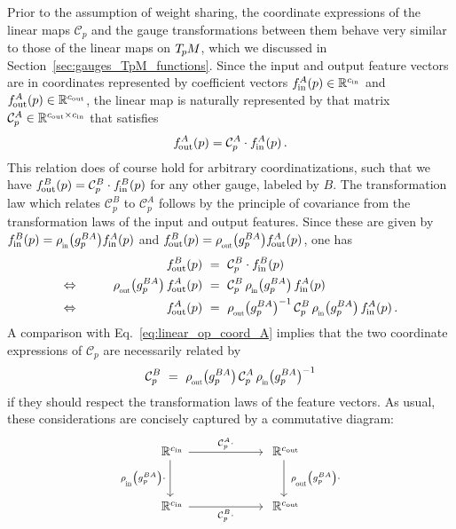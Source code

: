 Prior to the assumption of weight sharing, the coordinate expressions of the linear maps $\mathcal{C}_p$ and the gauge transformations between them behave very similar to those of the linear maps on $T_{\mkern-1.5mu p}\mkern-.5muM$, which we discussed in Section~\ref{sec:gauges_TpM_functions}.
Since the input and output feature vectors are in coordinates represented by coefficient vectors $f_\textup{\;\!\!in}^A(p) \in \mathbb{R}^{{c_\textup{in}}}$ and $f_\textup{\:\!\!out}^A(p) \in \mathbb{R}^{{c_\textup{out}}}$, the linear map is naturally represented by that matrix $\mathcal{C}_p^A \in \mathbb{R}^{{c_\textup{out}}\times{c_\textup{in}}}$ that satisfies
\begin{align}\label{eq:linear_op_coord_A}
    f_\textup{\:\!\!out}^A(p) = \mathcal{C}_p^A \cdot f_\textup{\;\!\!in}^A(p) \,.
\end{align}
This relation does of course hold for arbitrary coordinatizations, such that we have $f_\textup{\:\!\!out}^B(p) = \mathcal{C}_p^B \cdot f_\textup{\;\!\!in}^B(p)$ for any other gauge, labeled by $B$.
The transformation law which relates $\mathcal{C}_p^B$ to $\mathcal{C}_p^A$ follows by the principle of covariance from the transformation laws of the input and output features.
Since these are given by $\fin^B(p) = \rhoin\big( g_p^{BA}\big) \fin^A(p)$ and $\fout^B(p) = \rhoout\big( g_p^{BA}\big) \fout^A(p)$, one has
\begin{alignat}{3}
    && \fout^B(p)\ &=\ \mathcal{C}_p^B \cdot \fin^B(p)
    \notag \\ \Leftrightarrow \qquad
    && \rhoout\big( g_p^{BA}\big)\, \fout^A(p)\ &=\ \mathcal{C}_p^B\, \rhoin\big( g_p^{BA}\big)\, \fin^A(p)
    \notag \\ \Leftrightarrow \qquad
    && \fout^A(p)\ &=\ \rhoout\big( g_p^{BA}\big)^{-1}\, \mathcal{C}_p^B\, \rhoin\big( g_p^{BA}\big)\, \fin^A(p) \,.
\end{alignat}
A comparison with Eq.~\eqref{eq:linear_op_coord_A} implies that the two coordinate expressions of $\mathcal{C}_p$ are necessarily related by
\begin{align}\label{eq:linear_op_trafo_law}
    \mathcal{C}_p^B\ =\ \rhoout\big( g_p^{BA}\big)\, \mathcal{C}_p^A\, \rhoin\big( g_p^{BA}\big)^{-1}
\end{align}
if they should respect the transformation laws of the feature vectors.
As usual, these considerations are concisely captured by a commutative diagram:
\begin{equation}\label{cd:linear_op_trafo_law}
\begin{tikzcd}[column sep=60pt, row sep=30pt, font=\normalsize]
    \R^{\cin}
        \arrow[d, "\rhoin\big(g_p^{BA}\big)\cdot\,"']
        \arrow[r, "\mathcal{C}_p^A \cdot"]
    &
    \R^{\cout}
        \arrow[d, "\ \rhoout\big(g_p^{BA}\big) \cdot"]
    \\
    \R^{\cin}
        \arrow[r, "\mathcal{C}_p^B \cdot"']
    &
    \R^{\cout}
\end{tikzcd}
\end{equation}
